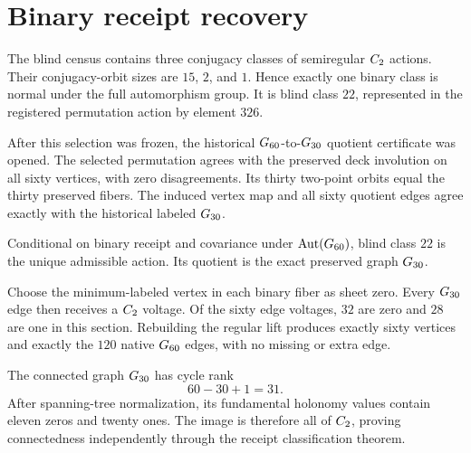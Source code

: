 \section{Binary receipt recovery}

The blind census contains three conjugacy classes of semiregular
\(C_{2}\) actions.  Their conjugacy-orbit sizes are \(15\), \(2\), and
\(1\).  Hence exactly one binary class is normal under the full
automorphism group.  It is blind class \(22\), represented in the
registered permutation action by element \(326\).

After this selection was frozen, the historical
\(G_{60}\)-to-\(G_{30}\) quotient certificate was opened.  The
selected permutation agrees with the preserved deck involution on all
sixty vertices, with zero disagreements.  Its thirty two-point orbits
equal the thirty preserved fibers.  The induced vertex map and all
sixty quotient edges agree exactly with the historical labeled
\(G_{30}\).

\begin{proposition}
Conditional on binary receipt and covariance under
\(\operatorname{Aut}(G_{60})\), blind class \(22\) is the unique admissible action.
Its quotient is the exact preserved graph \(G_{30}\).
\end{proposition}

Choose the minimum-labeled vertex in each binary fiber as sheet zero.
Every \(G_{30}\) edge then receives a \(C_{2}\) voltage.  Of the
sixty edge voltages, \(32\) are zero and \(28\) are one in this
section.  Rebuilding the regular lift produces exactly sixty vertices
and exactly the \(120\) native \(G_{60}\) edges, with no missing or
extra edge.

The connected graph \(G_{30}\) has cycle rank
\[
  60-30+1=31.
\]
After spanning-tree normalization, its fundamental holonomy values
contain eleven zeros and twenty ones.  The image is therefore all of
\(C_{2}\), proving connectedness independently through the receipt
classification theorem.
